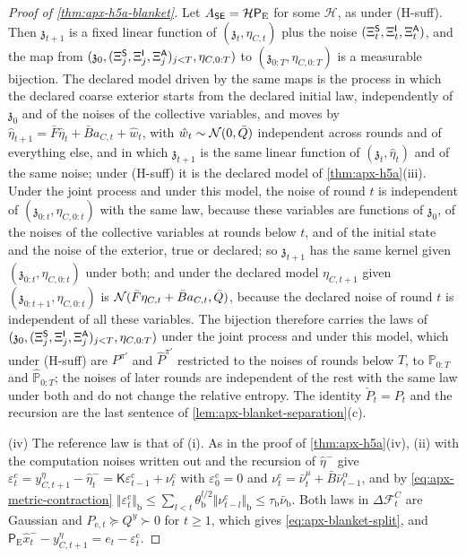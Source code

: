 \begin{proof}[Proof of \cref{thm:apx-h5a-blanket}]
Let $A_{\mathsf{S}\mathsf{E}}=\mathcal H\mathsf P_{\mathrm E}$ for some $\mathcal H$, as under (H-suff). Then $\mathfrak z_{t+1}$ is a fixed linear function of $(\mathfrak z_t,\eta_{C,t})$ plus the noise $(\Xi^{\mathsf{S}}_t,\Xi^{\mathsf{I}}_t,\Xi^{\mathsf{A}}_t)$, and the map from $(\mathfrak z_0,(\Xi^{\mathsf{S}}_j,\Xi^{\mathsf{I}}_j,\Xi^{\mathsf{A}}_j)_{j<T},\eta_{C,0:T})$ to $(\mathfrak z_{0:T},\eta_{C,0:T})$ is a measurable bijection. The declared model driven by the same maps is the process in which the declared coarse exterior starts from the declared initial law, independently of $\mathfrak z_0$ and of the noises of the collective variables, and moves by $\hat\eta_{t+1}=\bar F\hat\eta_t+\bar Ba_{C,t}+\hat w_t$, with $\hat w_t\sim\mathcal{N}(0,\bar Q)$ independent across rounds and of everything else, and in which $\mathfrak z_{t+1}$ is the same linear function of $(\mathfrak z_t,\hat\eta_t)$ and of the same noise; under (H-suff) it is the declared model of \cref{thm:apx-h5a}(iii). Under the joint process and under this model, the noise of round $t$ is independent of $(\mathfrak z_{0:t},\eta_{C,0:t})$ with the same law, because these variables are functions of $\mathfrak z_0$, of the noises of the collective variables at rounds below $t$, and of the initial state and the noise of the exterior, true or declared; so $\mathfrak z_{t+1}$ has the same kernel given $(\mathfrak z_{0:t},\eta_{C,0:t})$ under both; and under the declared model $\eta_{C,t+1}$ given $(\mathfrak z_{0:t+1},\eta_{C,0:t})$ is $\mathcal{N}(\bar F\eta_{C,t}+\bar Ba_{C,t},\bar Q)$, because the declared noise of round $t$ is independent of all these variables. The bijection therefore carries the laws of $(\mathfrak z_0,(\Xi^{\mathsf{S}}_j,\Xi^{\mathsf{I}}_j,\Xi^{\mathsf{A}}_j)_{j<T},\eta_{C,0:T})$ under the joint process and under this model, which under (H-suff) are $P^{\pi'}$ and $\hat P^{\pi'}$ restricted to the noises of rounds below $T$, to $\mathbb P_{0:T}$ and $\hat{\mathbb P}_{0:T}$; the noises of later rounds are independent of the rest with the same law under both and do not change the relative entropy. The identity $\check P_t=P_t$ and the recursion are the last sentence of \cref{lem:apx-blanket-separation}(c).

(iv) The reference law is that of (i). As in the proof of \cref{thm:apx-h5a}(iv), (ii) with the computation noises written out and the recursion of $\hat\eta^-$ give $\varepsilon^{\mathrm c}_t=y^\eta_{C,t+1}-\hat\eta^-_t=\mathsf K\varepsilon^{\mathrm c}_{t-1}+\nu^{\mathrm c}_t$ with $\varepsilon^{\mathrm c}_0=0$ and $\nu^{\mathrm c}_t=\bar\nu^\mu_t+\bar B\bar\nu^\alpha_{t-1}$, and by \cref{eq:apx-metric-contraction} $\Vert\varepsilon^{\mathrm c}_t\Vert_{\mathrm b}\le\sum_{l<t}\theta_{\mathrm b}^{l/2}\Vert\nu^{\mathrm c}_{t-l}\Vert_{\mathrm b}\le\tau_{\mathrm b}\bar\nu_{\mathrm b}$. Both laws in $\Delta\mathcal F^C_t$ are Gaussian and $P_{\mathrm e,t}\succeq Q^y\succ0$ for $t\ge1$, which gives \eqref{eq:apx-blanket-split}, and $\mathsf P_{\mathrm E}\hat x^-_t-y^\eta_{C,t+1}=e_t-\varepsilon^{\mathrm c}_t$.


\end{proof}
